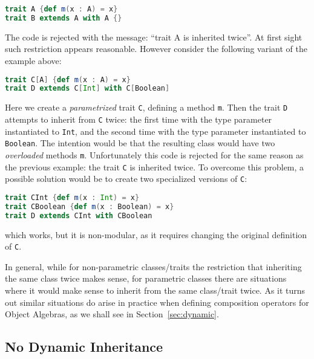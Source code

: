 \begin{lstlisting}[language=scala]
trait A {def m(x : A) = x}
trait B extends A with A {}
\end{lstlisting}

\noindent The code is rejected with the message: ``trait A is
inherited twice''. At first sight such restriction appears
reasonable. However consider the following variant of the example 
above:

\begin{lstlisting}[language=scala]
trait C[A] {def m(x : A) = x}	
trait D extends C[Int] with C[Boolean]
\end{lstlisting}

\noindent Here we create a \emph{parametrized} trait \lstinline{C}, 
defining a method \lstinline{m}. Then the trait \lstinline{D} attempts 
to inherit from \lstinline{C} twice: the first time with the type
parameter instantiated to \lstinline{Int}, and the second time with
the type parameter instantiated to \lstinline{Boolean}. The intention 
would be that the resulting class would have two \emph{overloaded}
methods \lstinline{m}. Unfortunately this code is rejected for the
same reason as the previous example: the trait \lstinline{C} is
inherited twice. To overcome this problem, a possible solution would
be to create two specialized versions of \lstinline{C}:

\begin{lstlisting}[language=scala]
trait CInt {def m(x : Int) = x}
trait CBoolean {def m(x : Boolean) = x}
trait D extends CInt with CBoolean
\end{lstlisting}

\noindent which works, but it is non-modular, as it requires changing 
the original definition of \lstinline{C}. 

In general, while for non-parametric classes/traits the restriction
that inheriting the same class twice makes sense, for parametric
classes there are situations where it would make sense to inherit 
from the same class/trait twice. As it turns out similar situations 
do arise in practice when defining composition operators for
Object Algebras, as we shall see in Section~\ref{sec:dynamic}.

\subsection{No Dynamic Inheritance}
\label{sec:scala-merge}

